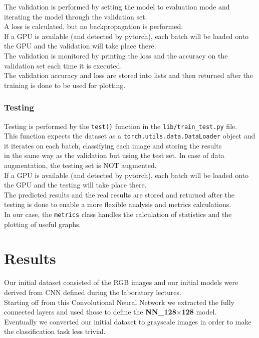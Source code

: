 \documentclass{report}
\begin{document}
The validation is performed by setting the model to evaluation mode and iterating the model through the validation set. \\
A loss is calculated, but no backpropagation is performed.\\
If a GPU is available (and detected by pytorch), each batch will be loaded onto the GPU and the validation will take place there. \\

The validation is monitored by printing the loss and the accuracy on the validation set each time it is executed. \\
The validation accuracy and loss are stored into lists and then returned after the training is done to be used for plotting. \\
\subsection{Testing}
Testing is performed by the \texttt{test()} function in the \texttt{lib/train\_test.py} file. \\
This function expects the dataset as a \texttt{torch.utils.data.DataLoader} object and it iterates on each batch, classifying each image and storing the results \\
in the same way as the validation but using the test set. In case of data augmentation, the testing set is NOT augmented.\\

If a GPU is available (and detected by pytorch), each batch will be loaded onto the GPU and the testing will take place there. \\

The predicted results and the real results are stored and returned after the testing is done to enable a more flexible analysis and metrics calculations.\\
In our case, the \texttt{metrics} class handles the calculation of statistics and the plotting of useful graphs.\\

\chapter{Results}
Our initial dataset consisted of the RGB images and our initial models were derived from CNN defined during the laboratory lectures.\\
Starting off from this Convolutional Neural Network we extracted the fully connected
layers and used those to define the \textbf{NN\_128$\times$128} model.\\
Eventually we converted our initial dataset to grayscale images in order to make the classification task less trivial.\\
\end{document}
